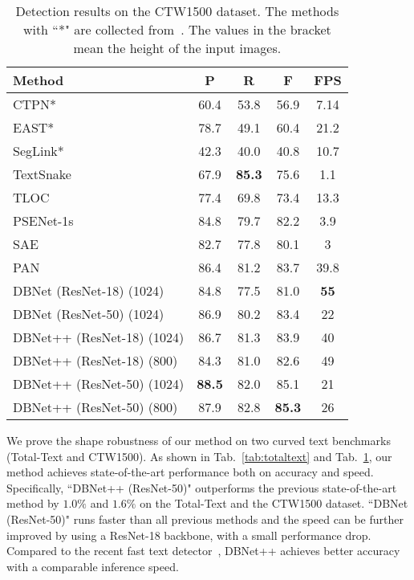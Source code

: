 \begin{table}[!ht]
\setlength{\tabcolsep}{9.5pt}
\centering
\caption{Detection results on the CTW1500 dataset. The methods with ``*" are collected from~\cite{ctw1500}. The values in the bracket mean the height of the input images.}
\begin{tabularx}{1.0\linewidth}{lc*{3}c}
\toprule
Method        & P             & R             & F             & FPS         \\ \midrule
CTPN*          & 60.4          & 53.8          & 56.9          & 7.14        \\ 
EAST*          & 78.7          & 49.1          & 60.4          & 21.2        \\ 
SegLink*       & 42.3            & 40.0            & 40.8            & 10.7         \\ 
TextSnake~\cite{long2018textsnake}     & 67.9          & \textbf{85.3}          & 75.6          & 1.1         \\ 
TLOC~\cite{ctw1500}     & 77.4            & 69.8          & 73.4          & 13.3           \\ 
PSENet-1s~\cite{wang2019shape}    & 84.8         & 79.7          & 82.2          & 3.9         \\ 
SAE~\cite{tian2019learning}       & 82.7          & 77.8          & 80.1    & 3  \\ 
PAN~\cite{wang2019efficient}  & 86.4          & 81.2          & 83.7    & 39.8  \\ 
\midrule  
DBNet (ResNet-18) (1024)~\cite{LiaoWYCB20} & 84.8          & 77.5          & 81.0          & \textbf{55} \\ 
DBNet (ResNet-50) (1024)~\cite{LiaoWYCB20} & 86.9 & 80.2 & 83.4 & 22          \\ 
\midrule
DBNet++ (ResNet-18) (1024)   & 86.7 & 81.3 & 83.9 & 40 \\ 
DBNet++ (ResNet-18) (800)   & 84.3 & 81.0 & 82.6 & 49  \\ 
DBNet++ (ResNet-50) (1024)   & \textbf{88.5} & 82.0 & 85.1 & 21  \\ 
DBNet++ (ResNet-50) (800)  & 87.9 & 82.8 & \textbf{85.3} & 26  \\ \bottomrule
\end{tabularx}
\label{tab:CTW}
\end{table}

We prove the shape robustness of our method on two curved text benchmarks (Total-Text and CTW1500). As shown in Tab.~\ref{tab:totaltext} and Tab.~\ref{tab:CTW}, our method achieves state-of-the-art performance both on accuracy and speed.
Specifically, ``DBNet++ (ResNet-50)" outperforms the previous state-of-the-art method by $1.0\%$ and $1.6\%$ on the Total-Text and the CTW1500 dataset.
``DBNet (ResNet-50)" runs faster than all previous methods and the speed can be further improved by using a ResNet-18 backbone, with a small performance drop. Compared to the recent fast text detector~\cite{wang2019efficient}, DBNet++ achieves better accuracy with a comparable inference speed.

